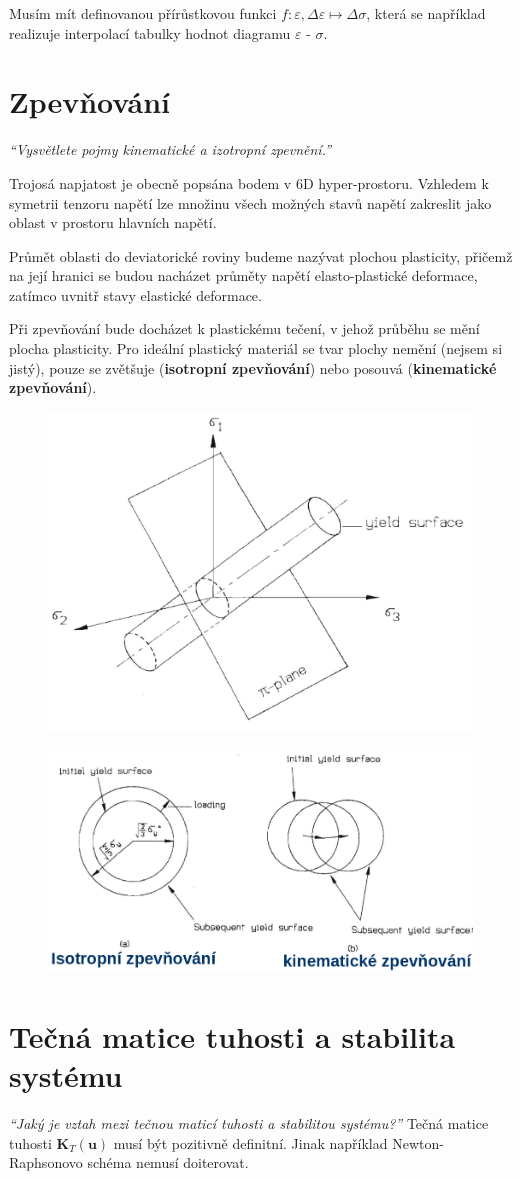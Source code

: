 \documentclass{article}
\begin{document}
	Musím mít definovanou přírůstkovou funkci $f : \varepsilon, \Delta\varepsilon \mapsto \Delta\sigma$, která se například realizuje interpolací tabulky hodnot diagramu $\varepsilon$ - $\sigma$.

	\section{Zpevňování}
	\emph{``Vysvětlete pojmy kinematické a izotropní zpevnění.''}

	Trojosá napjatost je obecně popsána bodem v 6D hyper-prostoru. Vzhledem k symetrii tenzoru napětí lze množinu všech možných stavů napětí zakreslit jako oblast v prostoru hlavních napětí.

	Průmět oblasti do deviatorické roviny budeme nazývat plochou plasticity, přičemž na její hranici se budou nacházet průměty napětí elasto-plastické deformace, zatímco uvnitř stavy elastické deformace.

	Při zpevňování bude docházet k plastickému tečení, v jehož průběhu se mění plocha plasticity. Pro ideální plastický materiál se tvar plochy nemění (nejsem si jistý), pouze se zvětšuje (\textbf{isotropní zpevňování}) nebo posouvá (\textbf{kinematické zpevňování}).
	\begin{figure}[h!]
		\centering
		\includegraphics[width=.5\linewidth]{figs/PlochaPlasticity.png}
	\end{figure}
	\begin{figure}[h!]
		\centering
		\includegraphics[width=.5\linewidth]{figs/Zpevnovani.png}
	\end{figure}

	\section{Tečná matice tuhosti a stabilita systému}
	\emph{``Jaký je vztah mezi tečnou maticí tuhosti a stabilitou systému?''}
	Tečná matice tuhosti $\bm{K}_T(\bm{u})$ musí být pozitivně definitní. Jinak například Newton-Raphsonovo schéma nemusí doiterovat.
\end{document}
